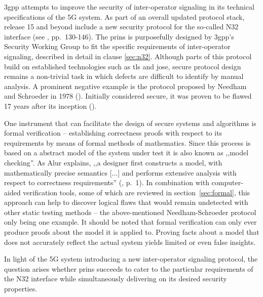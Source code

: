 \gls{3gpp} attempts to improve the security of inter-operator signaling in its technical specifications of the 5G system.
As part of an overall updated protocol stack, release 15 and beyond include a new security protocol for the so-called N32 interface (see \cite{3gpp.33.501}, pp.~130-146).
The \gls{prins} is purposefully designed by \gls{3gpp}'s Security Working Group to fit the specific requirements of inter-operator signaling, described in detail in clause \ref{sec:n32}.
Although parts of this protocol build on established technologies such as \gls{tls} and \gls{jose}, secure protocol design remains a non-trivial task in which defects are difficult to identify by manual analysis.
A prominent negative example is the protocol proposed by Needham and Schroeder in 1978 (\cite{needham1978using}).
Initially considered secure, it was proven to be flawed 17 years after its inception (\cite{lowe1996breaking}).

One instrument that can facilitate the design of secure systems and algorithms is formal verification -- establishing correctness proofs with respect to its requirements by means of formal methods of mathematics.
Since this process is based on a abstract model of the system under test it is also known as ,,model checking''.
As Alur explains, ,,a designer first constructs a model, with mathematically precise semantics [...] and performs extensive analysis with respect to correctness requirements'' (\cite{alur2011formal}, p.~1).
In combination with computer-aided verification tools, some of which are reviewed in section~\ref{sec:formal}, this approach can help to discover logical flaws that would remain undetected with other static testing methods -- the above-mentioned Needham-Schroeder protocol only being one example.
It should be noted that formal verification can only ever produce proofs about the model it is applied to.
Proving facts about a model that does not accurately reflect the actual system yields limited or even false insights.

In light of the 5G system introducing a new inter-operator signaling protocol, the question arises whether \gls{prins} succeeds to cater to the particular requirements of the N32 interface while simultaneously delivering on its desired security properties.
